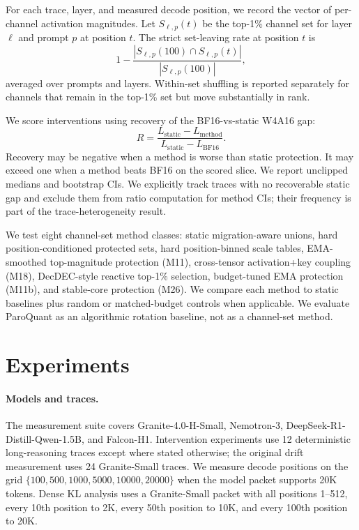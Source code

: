 \documentclass{article}
\begin{document}
For each trace, layer, and measured decode position, we record the vector of per-channel activation magnitudes. Let $S_{\ell,p}(t)$ be the top-1\% channel set for layer $\ell$ and prompt $p$ at position $t$. The strict set-leaving rate at position $t$ is
\begin{equation}
  1 - \frac{|S_{\ell,p}(100) \cap S_{\ell,p}(t)|}{|S_{\ell,p}(100)|},
\end{equation}
averaged over prompts and layers. Within-set shuffling is reported separately for channels that remain in the top-1\% set but move substantially in rank.

We score interventions using recovery of the BF16-vs-static W4A16 gap:
\begin{equation}
  R = \frac{L_{\text{static}} - L_{\text{method}}}{L_{\text{static}} - L_{\text{BF16}}}.
\end{equation}
Recovery may be negative when a method is worse than static protection. It may exceed one when a method beats BF16 on the scored slice. We report unclipped medians and bootstrap CIs. We explicitly track traces with no recoverable static gap and exclude them from ratio computation for method CIs; their frequency is part of the trace-heterogeneity result.

We test eight channel-set method classes: static migration-aware unions, hard position-conditioned protected sets, hard position-binned scale tables, EMA-smoothed top-magnitude protection (M11), cross-tensor activation+key coupling (M18), DecDEC-style reactive top-1\% selection, budget-tuned EMA protection (M11b), and stable-core protection (M26). We compare each method to static baselines plus random or matched-budget controls when applicable. We evaluate ParoQuant as an algorithmic rotation baseline, not as a channel-set method.

\section{Experiments}

\paragraph{Models and traces.} The measurement suite covers Granite-4.0-H-Small, Nemotron-3, DeepSeek-R1-Distill-Qwen-1.5B, and Falcon-H1. Intervention experiments use 12 deterministic long-reasoning traces except where stated otherwise; the original drift measurement uses 24 Granite-Small traces. We measure decode positions on the grid $\{100,500,1000,5000,10000,20000\}$ when the model packet supports 20K tokens. Dense KL analysis uses a Granite-Small packet with all positions 1--512, every 10th position to 2K, every 50th position to 10K, and every 100th position to 20K.
\end{document}
